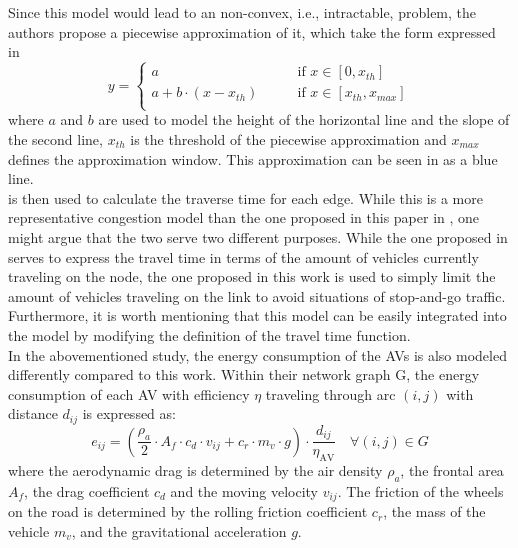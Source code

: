 Since this model would lead to an non-convex, i.e., intractable, problem, the authors propose a piecewise approximation of it, which take the form expressed in 
\begin{equation}
	y = \begin{cases}
		a \quad\quad &\text{if } x\in[0,x_{th}]\\ 
		a + b\cdot(x - x_{th}) \quad\quad &\text{if }x\in[x_{th}, x_{max}]\\ 
	\end{cases}
	\label{eq:model_bpr_approximation}
\end{equation}
where $a$ and $b$ are used to model the height of the horizontal line and the slope of the second line, $x_{th}$ is the threshold of the piecewise approximation and $x_{max}$ defines the approximation window. This approximation can be seen in  as a blue line. \\
 is then used to calculate the traverse time for each edge. While this is a more representative congestion model than the one proposed in this paper in , one might argue that the two serve two different purposes. While the one proposed in \cite{Salaza2019Cong} serves to express the travel time in terms of the amount of vehicles currently traveling on the node, the one proposed in this work is used to simply limit the amount of vehicles
traveling on the link to avoid situations of stop-and-go traffic. Furthermore, it is worth mentioning that this model can be easily integrated into the model by modifying the definition of the travel time function. \\
In the abovementioned study, the energy consumption of the AVs is also modeled differently compared to this work. Within their network graph G, the energy consumption of each AV with efficiency $\eta$ traveling through arc $(i,j)$ with distance $d_{ij}$ is expressed as:
\begin{equation}
e_{ij} = (\dfrac{\rho_a}{2}\cdot A_f \cdot c_d \cdot v_{ij} + c_r \cdot m_v \cdot g)\cdot \dfrac{d_{ij}}{\eta_{\text{AV}}} \quad \forall (i,j) \in G
\end{equation}
where the aerodynamic drag is determined by the air density $\rho_a$, the frontal area $A_f$, the drag coefficient $c_d$ and the moving velocity $v_{ij}$. The friction of the wheels on the road is determined by the rolling friction coefficient $c_r$, the mass of the vehicle $m_v$, and the gravitational acceleration $g$. \\ 
